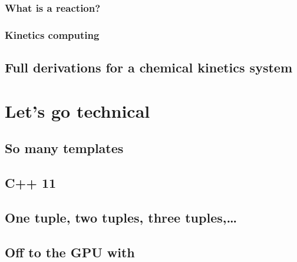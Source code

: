 \documentclass[twoside]{report}
\begin{document}
\subsection{What is a reaction?}
\label{kinetics_gen}


\subsection{Kinetics computing}
\label{kinetics_comput}


\section{Full derivations for a chemical kinetics system}
\label{derivations}



\chapter{Let's go technical}
\chaptermark{\ANTIOCHTech}
\label{Antioch:technique}

\section{So many templates}

\section{C++ 11}

\section{One tuple, two tuples, three tuples,\dots}

\section{\EIGEN}

\section{\Boost}

\section{\MetaPhysicL}

\section{Off to the GPU with \VexCL}
\end{document}
